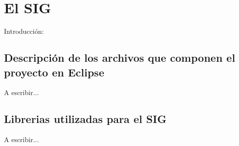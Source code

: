 \chapter{El \acf{SIG}}
\label{sec:sig}

Introducci\'on:

\section{Descripci\'on de los archivos que componen el proyecto en Eclipse}
\label{sec:sig.sources}

A escribir...


\section{Librerias utilizadas para el \ac{SIG}}
\label{sec:sig.libraries}

A escribir...




